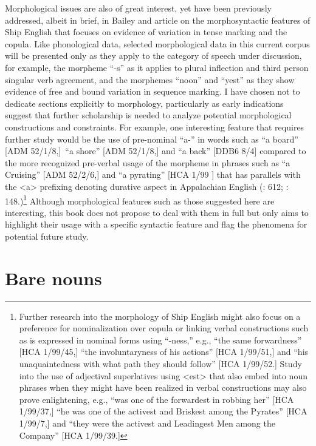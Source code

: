 Morphological issues are also of great interest, yet have been previously addressed, albeit in brief, in Bailey and  article on the morphosyntactic features of Ship English that focuses on evidence of variation in tense marking and the copula. Like phonological data, selected morphological data in this current corpus will be presented only as they apply to the category of speech under discussion, for example, the morpheme “-s” as it applies to plural inflection and third person singular verb agreement, and the morphemes “noon” and “yest” as they show evidence of free and bound variation in sequence marking. I have chosen not to dedicate sections explicitly to morphology, particularly as early indications suggest that further scholarship is needed to analyze potential morphological constructions and constraints. For example, one interesting feature that requires further study would be the use of pre-nominal “a-” in words such as “a board” [ADM 52/1/8,]~“a shore” [ADM 52/1/8,] and “a back” [DDB6 8/4] compared to the more recognized pre-verbal usage of the morpheme in phrases such as “a Cruising” [ADM 52/2/6,] and “a pyrating” [HCA 1/99 \citealt{Barbados1733}] that has parallels with the <a> prefixing denoting durative aspect in Appalachian English (\citealt{Hickey2004}: 612; \citealt{Montgomery2001}: 148.)\footnote{Further research into the morphology of Ship English might also focus on a preference for nominalization over copula or linking verbal constructions such as is expressed in nominal forms using “-ness,” e.g., “the same forwardness” [HCA 1/99/45,] “the involuntaryness of his actions” [HCA 1/99/51,] and “his unaquaintedness with what path they should follow” [HCA 1/99/52.] Study into the use of adjectival superlatives using <est> that also embed into noun phrases when they might have been realized in verbal constructions may also prove enlightening, e.g., “was one of the forwardest in robbing her” [HCA 1/99/37,] “he was one of the activest and Briskest among the Pyrates” [HCA 1/99/7,] and “they were the activest and Leadingest Men among the Company” [HCA 1/99/39.]} Although morphological features such as those suggested here are interesting, this book does not propose to deal with them in full but only aims to highlight their usage with a specific syntactic feature and flag the phenomena for potential future study. 

\section{{Bare} {nouns}}%


